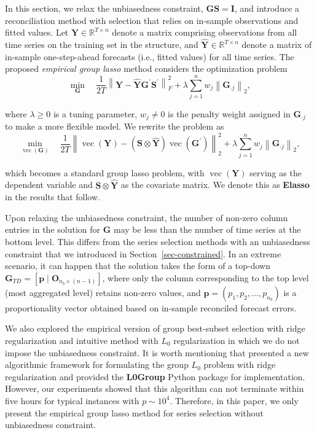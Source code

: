 \documentclass[11pt,a4paper,]{article}
\begin{document}
In this section, we relax the unbiasedness constraint,
\(\boldsymbol{GS} = \boldsymbol{I}\), and introduce a reconciliation
method with selection that relies on in-sample observations and fitted
values. Let \(\boldsymbol{Y} \in \mathbb{R}^{T \times n}\) denote a
matrix comprising observations from all time series on the training set
in the structure, and
\(\hat{\boldsymbol{Y}} \in \mathbb{R}^{T \times n}\) denote a matrix of
in-sample one-step-ahead forecasts (i.e., fitted values) for all time
series. The proposed \emph{empirical group lasso} method considers the
optimization problem \[
\min _{\boldsymbol{G}} \quad \frac{1}{2 T} \left\|\boldsymbol{Y}-\hat{\boldsymbol{Y}} \boldsymbol{G}^{\prime} \boldsymbol{S}^{\prime}\right\|_F^2 + \lambda \sum_{j=1}^n w_j \left\|\boldsymbol{G}_{\cdot j}\right\|_2,
\]

where \(\lambda \geq 0\) is a tuning parameter, \(w_j \neq 0\) is the
penalty weight assigned in \(\boldsymbol{G}_{\cdot j}\) to make a more
flexible model. We rewrite the problem as \[
\min _{\operatorname{vec}(\boldsymbol{G})} \quad \frac{1}{2 T} \left\|\operatorname{vec}(\boldsymbol{Y})-(\boldsymbol{S} \otimes \hat{\boldsymbol{Y}}) \operatorname{vec}\left(\boldsymbol{G}^{\prime}\right)\right\|_2^2 + \lambda \sum_{j=1}^n w_j \left\|\boldsymbol{G}_{\cdot j}\right\|_2,
\]

which becomes a standard group lasso problem, with
\(\operatorname{vec}(\boldsymbol{Y})\) serving as the dependent variable
and \(\boldsymbol{S} \otimes \hat{\boldsymbol{Y}}\) as the covariate
matrix. We denote this as \textbf{Elasso} in the results that follow.

Upon relaxing the unbiasedness constraint, the number of non-zero column
entries in the solution for \(\boldsymbol{G}\) may be less than the
number of time series at the bottom level. This differs from the series
selection methods with an unbiasedness constraint that we introduced in
Section~\ref{sec-constrained}. In an extreme scenario, it can happen
that the solution takes the form of a top-down
\(\boldsymbol{G}_{TD}=[\boldsymbol{p} \mid \boldsymbol{O}_{n_b \times (n-1)}]\),
where only the column corresponding to the top level (most aggregated
level) retains non-zero values, and
\(\boldsymbol{p} = (p_1, p_2, \ldots, p_{n_b})\) is a proportionality
vector obtained based on in-sample reconciled forecast errors.

We also explored the empirical version of group best-subset selection
with ridge regularization and intuitive method with \(L_0\)
regularization in which we do not impose the unbiasedness constraint. It
is worth mentioning that \textcite{Hazimeh2023-ie} presented a new
algorithmic framework for formulating the group \(L_0\) problem with
ridge regularization and provided the \textbf{L0Group} Python package
for implementation. However, our experiments showed that this algorithm
can not terminate within five hours for typical instances with
\(p \sim 10^4\). Therefore, in this paper, we only present the empirical
group lasso method for series selection without unbiasedness constraint.
\end{document}
